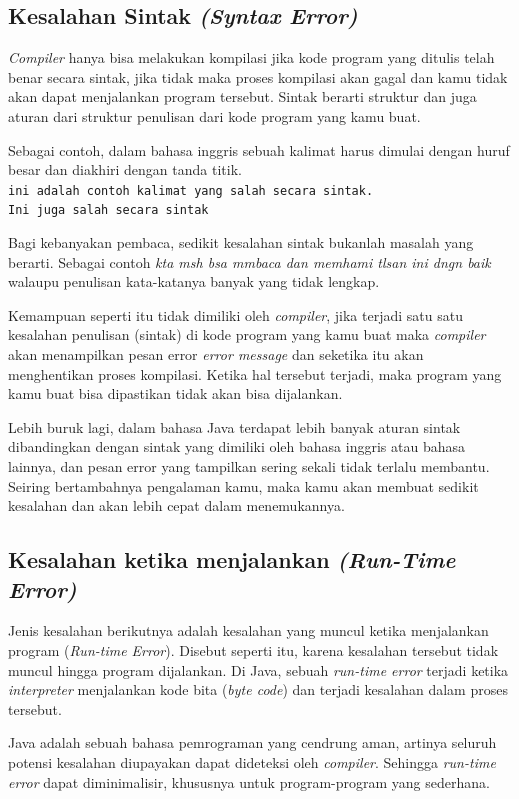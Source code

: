 \subsection{Kesalahan Sintak \textit{(Syntax Error)}}
\textit{Compiler} hanya bisa melakukan kompilasi jika kode program yang ditulis telah benar secara sintak, jika tidak maka proses kompilasi akan gagal dan kamu tidak akan dapat menjalankan program tersebut. Sintak berarti struktur dan juga aturan dari struktur penulisan dari kode program yang kamu buat.

Sebagai contoh, dalam bahasa inggris sebuah kalimat harus dimulai dengan huruf besar dan diakhiri dengan tanda titik. \\
\texttt{ini adalah contoh kalimat yang salah secara sintak.} \\
\texttt{Ini juga salah secara sintak}

Bagi kebanyakan pembaca, sedikit kesalahan sintak bukanlah masalah yang berarti. Sebagai contoh\textit{ kta msh bsa mmbaca dan memhami tlsan ini dngn baik} walaupu penulisan kata-katanya banyak yang tidak lengkap.

Kemampuan seperti itu tidak dimiliki oleh \textit{compiler}, jika terjadi satu satu kesalahan penulisan (sintak) di kode program yang kamu buat maka \textit{compiler} akan menampilkan pesan error \textit{error message} dan seketika itu akan menghentikan proses kompilasi. Ketika hal tersebut terjadi, maka program yang kamu buat bisa dipastikan tidak akan bisa dijalankan.

Lebih buruk lagi, dalam bahasa Java terdapat lebih banyak aturan sintak dibandingkan dengan sintak yang dimiliki oleh bahasa inggris atau bahasa lainnya, dan pesan error yang tampilkan sering sekali tidak terlalu membantu. Seiring bertambahnya pengalaman kamu, maka kamu akan membuat sedikit kesalahan dan akan lebih cepat dalam menemukannya.
\subsection{Kesalahan ketika menjalankan \textit{(Run-Time Error)}}
Jenis kesalahan berikutnya adalah kesalahan yang muncul ketika menjalankan program (\textit{Run-time Error}). Disebut seperti itu, karena kesalahan tersebut tidak muncul hingga program dijalankan. Di Java, sebuah \textit{run-time error} terjadi ketika \textit{interpreter} menjalankan kode bita (\textit{byte code}) dan terjadi kesalahan dalam proses tersebut.

Java adalah sebuah bahasa pemrograman yang cendrung aman, artinya seluruh potensi kesalahan diupayakan dapat dideteksi oleh \textit{compiler}. Sehingga \textit{run-time error} dapat diminimalisir, khususnya untuk program-program yang sederhana.

